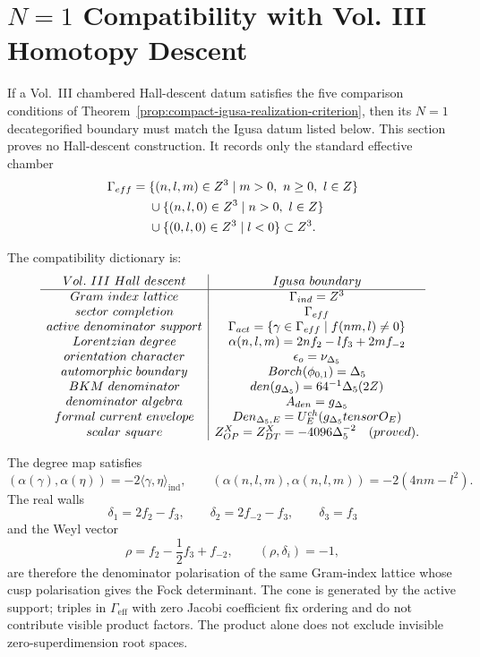 \section{\texorpdfstring{$N=1$}{N=1} Compatibility with Vol. III Homotopy Descent}
\label{sec:vol3-homotopy-positive-cone-dictionary}

If a Vol.~III chambered Hall-descent datum satisfies the five comparison
conditions of Theorem~\ref{prop:compact-igusa-realization-criterion},
then its \(N=1\) decategorified boundary must match the Igusa datum
listed below.  This section proves no Hall-descent construction.  It
records only the standard effective chamber
\[
\begin{aligned}
\Gamma_{eff}
= {}&
\{(n,l,m)\in Z^3\mid m>0,\ n\ge0,\ l\in Z\}\\
&{}\cup\{(n,l,0)\in Z^3\mid n>0,\ l\in Z\}\\
&{}\cup\{(0,l,0)\in Z^3\mid l<0\}
\subset Z^3 .
\end{aligned}
\]

The compatibility dictionary is:
$$
\begin{array}{c|c}
Vol.\ III\ Hall\ descent & Igusa\ boundary\\ \hline
Gram\ index\ lattice & \Gamma_{ind}=Z^3\\
sector\ completion & \Gamma_{eff}\\
active\ denominator\ support &
\Gamma_{act}=\{\gamma\in\Gamma_{eff}\mid f(nm,l)\ne0\}\\
Lorentzian\ degree &
\alpha(n,l,m)=2nf_2-lf_3+2mf_{-2}\\
orientation\ character & \epsilon_o=\nu_{\Delta_5}\\
automorphic\ boundary &
Borch(\phi_{0,1})=\Delta_5\\
BKM\ denominator &
den(g_{\Delta_5})=64^{-1}\Delta_5(2Z)\\
denominator\ algebra &
A_{den}=g_{\Delta_5}\\
formal\ current\ envelope &
Den_{\Delta_5,E}
=U_E^{ch}(g_{\Delta_5}tensorO_E)\\
scalar\ square &
Z^X_{OP}=Z^X_{DT}=-4096\Delta_5^{-2}\quad(proved).
\end{array}
$$

The degree map satisfies
$$
(\alpha(\gamma),\alpha(\eta))
=-2\langle\gamma,\eta\rangle_{\mathrm{ind}},
\qquad
(\alpha(n,l,m),\alpha(n,l,m))=-2(4nm-l^2).
$$
The real walls
$$
\delta_1=2f_2-f_3,\qquad
\delta_2=2f_{-2}-f_3,\qquad
\delta_3=f_3
$$
and the Weyl vector
$$
\rho=f_2-\frac12 f_3+f_{-2},\qquad
(\rho,\delta_i)=-1,
$$
are therefore the denominator polarisation of the same Gram-index
lattice whose cusp polarisation gives the Fock determinant.  The cone is
generated by the active support; triples in \(\Gamma_{\mathrm{eff}}\)
with zero Jacobi coefficient fix ordering and do not contribute visible
product factors.  The product alone does not exclude invisible
zero-superdimension root spaces.

